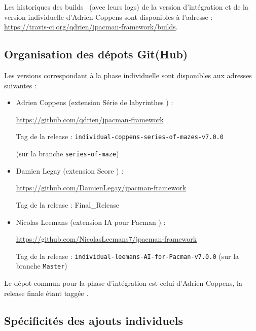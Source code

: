 \documentclass[12pt, openany]{report}
\begin{document}
Les historiques des \og builds \fg \, (avec leurs logs) de la version d'intégration et de la version individuelle d'Adrien Coppens sont disponibles à l'adresse : \url{https://travis-ci.org/qdrien/jpacman-framework/builds}.

\subsection{Organisation des dépots Git(Hub)}
Les versions correspondant à la phase individuelle sont disponibles aux adresses suivantes :
\begin{itemize}
	\item Adrien Coppens (extension \og Série de labyrinthes \fg ) : 
	
	\url{https://github.com/qdrien/jpacman-framework}
	
	Tag de la release : \nolinkurl{individual-coppens-series-of-mazes-v7.0.0}
	
	(sur la branche \nolinkurl{series-of-maze})
	\item Damien Legay (extension \og Score \fg ) : 
	
	\url{https://github.com/DamienLegay/jpacman-framework}
	
	Tag de la release : \nolinkurl{}{Final\_Release}
	\item Nicolas Leemans (extension \og IA pour Pacman \fg ) : 
	
	\url{https://github.com/NicolasLeemans7/jpacman-framework}
	
	Tag de la release : \nolinkurl{individual-leemans-AI-for-Pacman-v7.0.0}
	(sur la branche \nolinkurl{Master})
\end{itemize}

Le dépot commun pour la phase d'intégration est celui d'Adrien Coppens, la release finale étant taggée \nolinkurl{}. %



\subsection{Spécificités des ajouts individuels}
\end{document}
